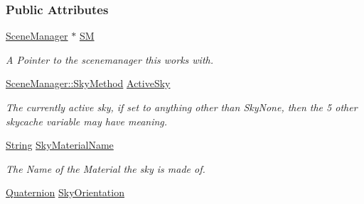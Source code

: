 \subsubsection*{Public Attributes}
\begin{DoxyCompactItemize}
\item 
\hypertarget{classphys_1_1internal_1_1SceneManagerData_afd470b7bdba16d0840ce18bb1846fa82}{
\hyperlink{classphys_1_1SceneManager}{SceneManager} $\ast$ \hyperlink{classphys_1_1internal_1_1SceneManagerData_afd470b7bdba16d0840ce18bb1846fa82}{SM}}
\label{classphys_1_1internal_1_1SceneManagerData_afd470b7bdba16d0840ce18bb1846fa82}

\begin{DoxyCompactList}\small\item\em A Pointer to the scenemanager this works with. \item\end{DoxyCompactList}\item 
\hypertarget{classphys_1_1internal_1_1SceneManagerData_a1106e747889ca1b177c33dbe1ea9f775}{
\hyperlink{classphys_1_1SceneManager_a91dd086aabaab926d070c65fc14828d6}{SceneManager::SkyMethod} \hyperlink{classphys_1_1internal_1_1SceneManagerData_a1106e747889ca1b177c33dbe1ea9f775}{ActiveSky}}
\label{classphys_1_1internal_1_1SceneManagerData_a1106e747889ca1b177c33dbe1ea9f775}

\begin{DoxyCompactList}\small\item\em The currently active sky, if set to anything other than SkyNone, then the 5 other skycache variable may have meaning. \item\end{DoxyCompactList}\item 
\hypertarget{classphys_1_1internal_1_1SceneManagerData_a5a450396db70a6705fc0625aab1fb047}{
\hyperlink{namespacephys_aa03900411993de7fbfec4789bc1d392e}{String} \hyperlink{classphys_1_1internal_1_1SceneManagerData_a5a450396db70a6705fc0625aab1fb047}{SkyMaterialName}}
\label{classphys_1_1internal_1_1SceneManagerData_a5a450396db70a6705fc0625aab1fb047}

\begin{DoxyCompactList}\small\item\em The Name of the Material the sky is made of. \item\end{DoxyCompactList}\item 
\hypertarget{classphys_1_1internal_1_1SceneManagerData_af28e91e743235d1950527bec3071d59a}{
\hyperlink{classphys_1_1Quaternion}{Quaternion} \hyperlink{classphys_1_1internal_1_1SceneManagerData_af28e91e743235d1950527bec3071d59a}{SkyOrientation}}
\label{classphys_1_1internal_1_1SceneManagerData_af28e91e743235d1950527bec3071d59a}


\end{DoxyCompactItemize}

